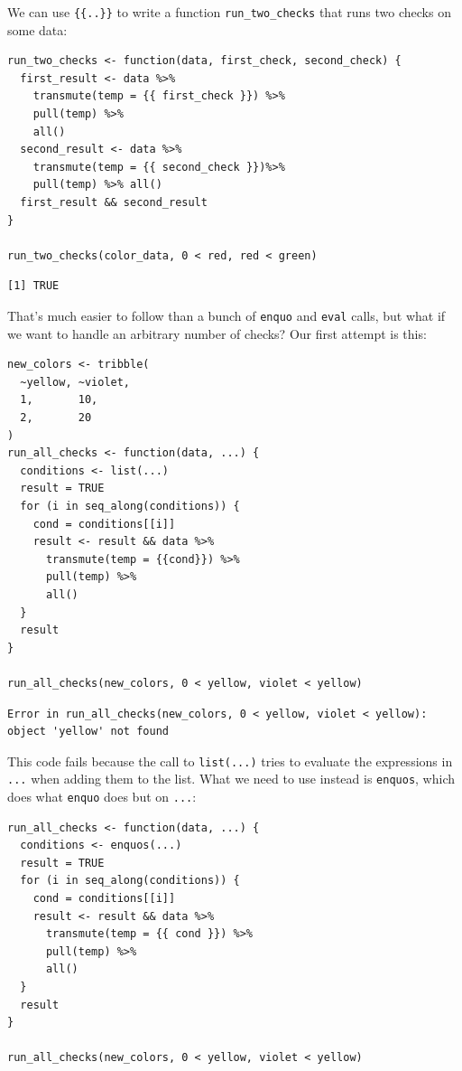 We can use \texttt{\{\{..\}\}} to write a function \texttt{run\_two\_checks}
that runs two checks on some data:

\begin{lstlisting}
run_two_checks <- function(data, first_check, second_check) {
  first_result <- data %>%
    transmute(temp = {{ first_check }}) %>%
    pull(temp) %>%
    all()
  second_result <- data %>%
    transmute(temp = {{ second_check }})%>%
    pull(temp) %>% all()
  first_result && second_result
}

run_two_checks(color_data, 0 < red, red < green)
\end{lstlisting}

\begin{lstlisting}
[1] TRUE
\end{lstlisting}

That's much easier to follow than a bunch of \texttt{enquo} and \texttt{eval} calls,
but what if we want to handle an arbitrary number of checks?
Our first attempt is this:

\begin{lstlisting}
new_colors <- tribble(
  ~yellow, ~violet,
  1,       10,
  2,       20
)
run_all_checks <- function(data, ...) {
  conditions <- list(...)
  result = TRUE
  for (i in seq_along(conditions)) {
    cond = conditions[[i]]
    result <- result && data %>%
      transmute(temp = {{cond}}) %>%
      pull(temp) %>%
      all()
  }
  result
}

run_all_checks(new_colors, 0 < yellow, violet < yellow)
\end{lstlisting}

\begin{lstlisting}
Error in run_all_checks(new_colors, 0 < yellow, violet < yellow): object 'yellow' not found
\end{lstlisting}

This code fails because the call to \texttt{list(...)} tries to evaluate the expressions in \texttt{...}
when adding them to the list.
What we need to use instead is \texttt{enquos},
which does what \texttt{enquo} does but on \texttt{...}:

\begin{lstlisting}
run_all_checks <- function(data, ...) {
  conditions <- enquos(...)
  result = TRUE
  for (i in seq_along(conditions)) {
    cond = conditions[[i]]
    result <- result && data %>%
      transmute(temp = {{ cond }}) %>%
      pull(temp) %>%
      all()
  }
  result
}

run_all_checks(new_colors, 0 < yellow, violet < yellow)
\end{lstlisting}

